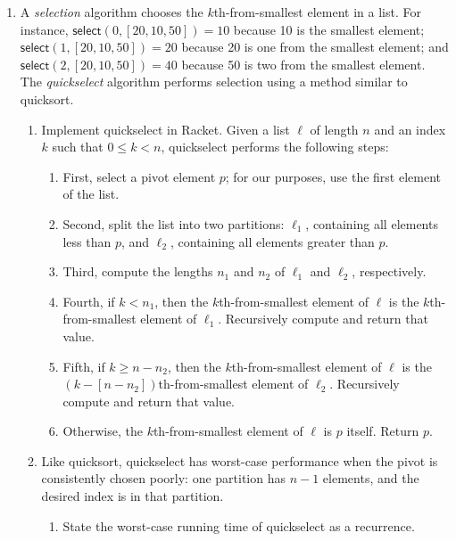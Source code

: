\documentclass{article}
\begin{document}
\begin{enumerate}

  \pagebreak[1]
\item
  A \emph{selection} algorithm chooses the \(k\)th-from-smallest element in a
  list.  For instance, \(\mathsf{select}(0,[20,10,50])=10\) because 10 is the
  smallest element; \(\mathsf{select}(1,[20,10,50])=20\) because 20 is one from
  the smallest element; and \(\mathsf{select}(2,[20,10,50])=40\) because 50 is
  two from the smallest element.  The \emph{quickselect} algorithm performs
  selection using a method similar to quicksort.
  \begin{enumerate}
  \item
    Implement quickselect in Racket.  Given a list \(\ell\) of length \(n\) and
    an index \(k\) such that \(0 \leq k < n\), quickselect performs the
    following steps:
    \begin{enumerate}
    \item
      First, select a pivot element \(p\); for our purposes, use the first
      element of the list.
    \item
      Second, split the list into two partitions: \(\ell_1\), containing all
      elements less than \(p\), and \(\ell_2\), containing all elements greater
      than \(p\).
    \item
      Third, compute the lengths \(n_1\) and \(n_2\) of \(\ell_1\) and
      \(\ell_2\), respectively.
    \item
      Fourth, if \(k < n_1\), then the \(k\)th-from-smallest element of \(\ell\)
      is the \(k\)th-from-smallest element of \(\ell_1\).  Recursively compute
      and return that value.
    \item
      Fifth, if \(k \geq n - n_2\), then the \(k\)th-from-smallest element of
      \(\ell\) is the \((k - [n - n_2])\)th-from-smallest element of \(\ell_2\).
      Recursively compute and return that value.
    \item
      Otherwise, the \(k\)th-from-smallest element of \(\ell\) is \(p\) itself.
      Return \(p\).
    \end{enumerate}
  \item
    Like quicksort, quickselect has worst-case performance when the pivot is
    consistently chosen poorly: one partition has \(n-1\) elements, and the
    desired index is in that partition.
    \begin{enumerate}
    \item State the worst-case running time of quickselect as a recurrence.

\end{enumerate}
\end{enumerate}
\end{enumerate}
\end{document}
